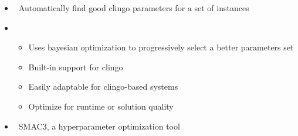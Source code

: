 \begin{frame}{\acclingo}
  \begin{itemize}
    \item {} \ Automatically find good clingo parameters for a set of instances
    \item {} \
      \begin{itemize}
        \item Uses bayesian optimization to progressively select a better parameters set
        \item Built-in support for clingo
        \item Easily adaptable for clingo-based systems
        \item Optimize for runtime or solution quality
      \end{itemize}
    \item {} \ SMAC3, a hyperparameter optimization tool
    \end{itemize}
  \end{frame}
%
